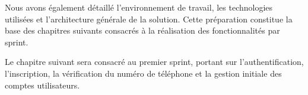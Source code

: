 Nous avons également détaillé l’environnement de travail, les technologies utilisées et l’architecture générale de la solution. Cette préparation constitue la base des chapitres suivants consacrés à la réalisation des fonctionnalités par sprint.

Le chapitre suivant sera consacré au premier sprint, portant sur l’authentification, l’inscription, la vérification du numéro de téléphone et la gestion initiale des comptes utilisateurs.

